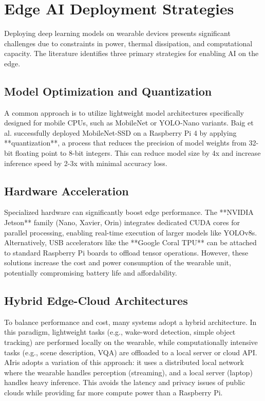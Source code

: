 \documentclass[12pt,a4paper]{report}
\begin{document}
\section{Edge AI Deployment Strategies}

Deploying deep learning models on wearable devices presents significant challenges due to constraints in power, thermal dissipation, and computational capacity. The literature identifies three primary strategies for enabling AI on the edge.

\subsection{Model Optimization and Quantization}
A common approach is to utilize lightweight model architectures specifically designed for mobile CPUs, such as MobileNet \cite{mobilenet} or YOLO-Nano variants. Baig et al. \cite{baig2024} successfully deployed MobileNet-SSD on a Raspberry Pi 4 by applying **quantization**, a process that reduces the precision of model weights from 32-bit floating point to 8-bit integers. This can reduce model size by 4x and increase inference speed by 2-3x with minimal accuracy loss.

\subsection{Hardware Acceleration}
Specialized hardware can significantly boost edge performance. The **NVIDIA Jetson** family (Nano, Xavier, Orin) integrates dedicated CUDA cores for parallel processing, enabling real-time execution of larger models like YOLOv8s. Alternatively, USB accelerators like the **Google Coral TPU** can be attached to standard Raspberry Pi boards to offload tensor operations. However, these solutions increase the cost and power consumption of the wearable unit, potentially compromising battery life and affordability.

\subsection{Hybrid Edge-Cloud Architectures}
To balance performance and cost, many systems adopt a hybrid architecture. In this paradigm, lightweight tasks (e.g., wake-word detection, simple object tracking) are performed locally on the wearable, while computationally intensive tasks (e.g., scene description, VQA) are offloaded to a local server or cloud API. AIris adopts a variation of this approach: it uses a distributed local network where the wearable handles perception (streaming), and a local server (laptop) handles heavy inference. This avoids the latency and privacy issues of public clouds while providing far more compute power than a Raspberry Pi.
\end{document}
